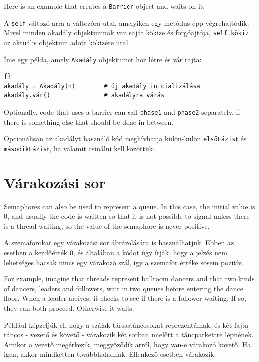 \documentclass{book}
\begin{document}
Here is an example that creates a {\tt Barrier}
object and waits on it:

A {\tt self} változó arra a változóra utal, amelyiken egy metódus épp végrehajtódik.
Mivel minden akadály objektumnak van saját kökize és forgóajtója,
{\tt self.kökiz} az aktuális objektum adott kökizére utal.

Íme egy példa, amely {\tt Akadály} objektumot hoz létre és vár rajta:

\begin{lstlisting}[title={Akadály interfész}]{}
akadály = Akadály(n)        # új akadály inicializálása
akadály.vár()               # akadályra várás
\end{lstlisting}

Optionally, code that uses a barrier can call {\tt phase1} and
{\tt phase2} separately, if there is something else that
should be done in between.

Opcionálisan az akadályt használó kód meghívhatja külön-külön
{\tt elsőFázis}t és {\tt másodikFázis}t, ha valamit csinálni
kell közöttük.



\section{Várakozási sor}
\label{dancers}

Semaphores can also be used to represent a queue.  In this
case, the initial value is 0, and usually the code is written
so that it is not possible
to signal unless there is a thread waiting, so the value of the
semaphore is never positive.

A szemaforokat egy várakozási sor ábrázolására is használhatjuk.
Ebben az esetben a kezdőérték 0, és általában a kódot úgy írják,
hogy a jelzés nem lehetséges hacsak nincs egy várakozó szál,
így a szemafor értéke sosem pozitív.

For example, imagine that threads represent ballroom dancers
and that two kinds of dancers, leaders and followers, wait
in two queues before entering the dance floor.  When a leader
arrives, it checks to see if there is a follower waiting.
If so, they can both proceed.  Otherwise it waits.

Például képzeljük el, hogy a szálak társastáncosokat reprezentálnak,
és két fajta táncos - vezető és követő - várakozik két sorban
mielőtt a táncparkettre lépnének. Amikor a vezető megérkezik,
meggyőződik arról, hogy van-e várakozó követő. Ha igen, akkor
mindketten továbbhaladnak. Ellenkező esetben várakozik.
    
\end{document}

